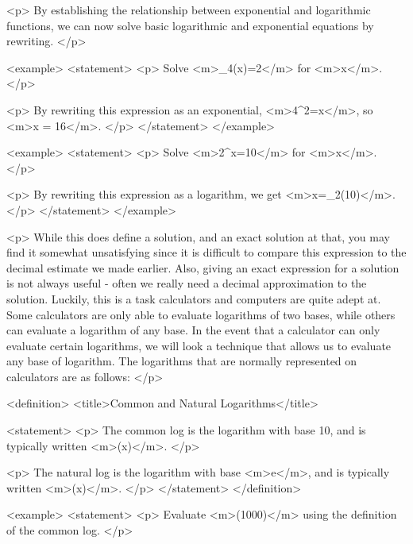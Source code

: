         <p>
            By establishing the relationship between exponential and logarithmic functions, we can now solve basic logarithmic and exponential equations by rewriting.
        </p>

        <example>
            <statement>
                <p>
                    Solve <m>\log_{4}⁡(x)=2</m> for <m>x</m>.
                </p>

                <p>
                    By rewriting this expression as an exponential, <m>4^{2}=x</m>, so <m>x = 16</m>.
                </p>
            </statement>
        </example>

        <example>
            <statement>
                <p>
                    Solve <m>2^{x}=10</m> for <m>x</m>.
                </p>

                <p>
                    By rewriting this expression as a logarithm, we get <m>x=\log_{2}⁡(10)</m>.
                </p>
            </statement>
        </example>

        <p>
            While this does define a solution, and an exact solution at that, you may find it somewhat unsatisfying since it is difficult to compare this expression to the decimal estimate we made earlier.
            Also, giving an exact expression for a solution is not always useful - often we really need a decimal approximation to the solution.
            Luckily, this is a task calculators and computers are quite adept at.
            Some calculators are only able to evaluate logarithms of two bases, while others can evaluate a logarithm of any base.
            In the event that a calculator can only evaluate certain logarithms, we will look a technique that allows us to evaluate any base of logarithm.
            The logarithms that are normally represented on calculators are as follows:
        </p>

        <definition>
            <title>Common and Natural Logarithms</title>

            <statement>
                <p>
                    The common log is the logarithm with base 10, and is typically written <m>\log⁡(x)</m>.
                </p>

                <p>
                    The natural log is the logarithm with base <m>e</m>, and is typically written <m>\ln⁡(x)</m>.
                </p>
            </statement>
        </definition>

        <example>
            <statement>
                <p>
                    Evaluate <m>\log⁡(1000)</m> using the definition of the common log.
                </p>

